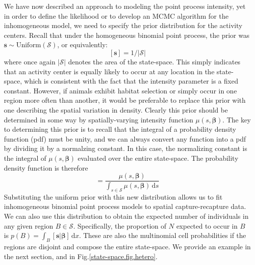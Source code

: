 We have now described an approach to modeling the point process
intensity, yet in order to define the likelihood or to develop an MCMC
algorithm for the inhomogeneous model, we need to specify the prior
distribution for the activity centers. Recall that under the
homogeneous binomial point process, the prior was
$\mathbf{s} \sim \text{Uniform}(\mathcal{S})$, or equivalently:
\begin{equation}
  \label{state-space.eq.uprior}
  [\mathbf{s}] = 1/|\mathcal{S}|
\end{equation}
where once again $|\mathcal{S}|$ denotes the area of the
state-space. This simply indicates that an activity center is equally
likely to occur at any location in the state-space, which is
consistent with the fact that the intensity parameter is a fixed
constant. However, if animals exhibit habitat selection or simply
occur in one region more often than another, it would be preferable to
replace this prior with one describing the spatial variation in
density. Clearly this prior should be determined in some way by
spatially-varying intensity function $\mu(s, \bm{\beta})$.
The key to determining this prior is to recall that
the integral of a probability density function (pdf) must be unity,
and we can always convert any function into a pdf by dividing it by a
normalzing constant. In this case, the normalizing constant is the integral
of $\mu(s, \bm{\beta})$ evaluated over the entire state-space.
The probability density function is therefore
\begin{equation}
[\mathbf{s} | \bm{\beta}] = \frac{\mu(s, \bm{\beta})}{\int_{s \in \mathcal{S}} \mu(s, \bm{\beta})\, \mathrm{d}s}
\label{state-space.eq.pdf.hetero}
\end{equation}
Substituting the uniform prior with this new distribution
allows us to fit inhomogeneous binomial point process
models to spatial capture-recapture data. We can also use this
distribution to obtain the expected number of individuals in any given
region $B \in \mathcal{S}$. Specifically, the proportion of $N$ expected to occur in
$B$ is $p(B) = \int_B [\mathbf{s} | \bm{\beta}]\, \mathrm{d}x$. These are
also the multinomial cell probabilities if the regions are
disjoint and compose the entire state-space. We provide an example in
the next section, and in Fig.\ref{state-space.fig.hetero}.

